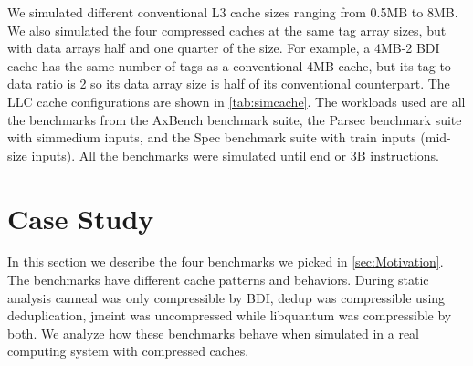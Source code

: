 We simulated different conventional L3 cache sizes ranging from 0.5MB to 8MB. We also simulated the four compressed caches at the same tag array sizes, but with data arrays half and one quarter of the size. For example, a 4MB-2 BDI cache has the same number of tags as a conventional 4MB cache, but its tag to data ratio is 2 so its data array size is half of its conventional counterpart. The LLC cache configurations are shown in \ref{tab:simcache}. The workloads used are all the benchmarks from the AxBench\cite{axbench} benchmark suite, the Parsec\cite{parsec} benchmark suite with simmedium inputs, and the Spec\cite{spec} benchmark suite with train inputs (mid-size inputs). All the benchmarks were simulated until end or 3B instructions.

\section{Case Study}
\label{sec:case_study}
In this section we describe the four benchmarks we picked in \ref{sec:Motivation}. The benchmarks have different cache patterns and behaviors. During static analysis canneal was only compressible by BDI, dedup was compressible using deduplication, jmeint was uncompressed while libquantum was compressible by both. We analyze how these benchmarks behave when simulated in a real computing system with compressed caches.\par
